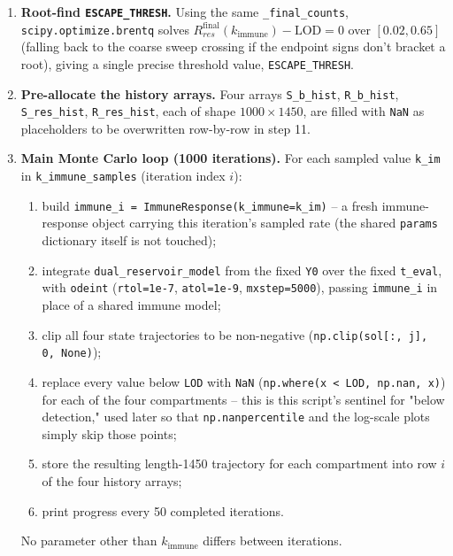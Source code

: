 \documentclass[11pt]{article}
\begin{document}
\begin{enumerate}
\item \textbf{Root-find \texttt{ESCAPE\_THRESH}.} Using the same
\texttt{\_final\_counts}, \texttt{scipy.optimize.brentq} solves
$R_{res}^{\mathrm{final}}(k_{\mathrm{immune}}) - \mathrm{LOD} = 0$ over
$[0.02, 0.65]$ (falling back to the coarse sweep crossing if the endpoint
signs don't bracket a root), giving a single precise threshold value,
\texttt{ESCAPE\_THRESH}.

\item \textbf{Pre-allocate the history arrays.} Four arrays
\texttt{S\_b\_hist}, \texttt{R\_b\_hist}, \texttt{S\_res\_hist},
\texttt{R\_res\_hist}, each of shape $1000 \times 1450$, are filled with
\texttt{NaN} as placeholders to be overwritten row-by-row in step 11.

\item \textbf{Main Monte Carlo loop (1000 iterations).} For each sampled
value \texttt{k\_im} in \texttt{k\_immune\_samples} (iteration index $i$):
\begin{enumerate}
\item[(a)] build \texttt{immune\_i = ImmuneResponse(k\_immune=k\_im)} -- a
fresh immune-response object carrying this iteration's sampled rate (the
shared \texttt{params} dictionary itself is not touched);
\item[(b)] integrate \texttt{dual\_reservoir\_model} from the fixed
\texttt{Y0} over the fixed \texttt{t\_eval}, with \texttt{odeint}
(\texttt{rtol=1e-7}, \texttt{atol=1e-9}, \texttt{mxstep=5000}), passing
\texttt{immune\_i} in place of a shared immune model;
\item[(c)] clip all four state trajectories to be non-negative
(\texttt{np.clip(sol[:, j], 0, None)});
\item[(d)] replace every value below \texttt{LOD} with \texttt{NaN}
(\texttt{np.where(x < LOD, np.nan, x)}) for each of the four compartments --
this is this script's sentinel for "below detection," used later so that
\texttt{np.nanpercentile} and the log-scale plots simply skip those points;
\item[(e)] store the resulting length-1450 trajectory for each compartment
into row $i$ of the four history arrays;
\item[(f)] print progress every 50 completed iterations.
\end{enumerate}
No parameter other than $k_{\mathrm{immune}}$ differs between iterations.


\end{enumerate}
\end{document}
